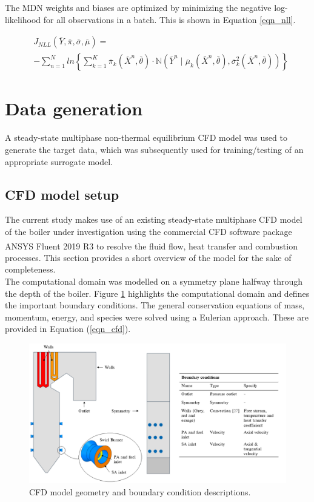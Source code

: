 \documentclass[a4paper,fleqn]{cas-dc}
\begin{document}
The MDN weights and biases are optimized by minimizing the negative log-likelihood for all observations in a batch. This is shown in Equation \ref{eqn_nll}.

\begin{equation}\label{eqn_nll}
\begin{split}
&J_{NLL}(\overline{Y},\overline{\pi},\overline{\sigma},\overline{\mu})=\\
&-\sum^N_{n=1}ln\left\{\sum^K_{k=1}\overline{\pi}_k(\overline{X}^n,\overline{\theta})\cdot \mathbb{N}(\overline{Y}^n\mid\overline{\mu}_k(\bar{X}^n,\bar{\theta}),\overline{\sigma}^2_k(\overline{X}^n,\overline{\theta})) \right\}
\end{split}
\end{equation}

\section{Data generation}
A steady-state multiphase non-thermal equilibrium CFD model was used to generate the target data, which was subsequently used for training/testing of an appropriate surrogate model.

\subsection{CFD model setup}
The current study makes use of an existing steady-state multiphase CFD model \cite{Rawlins2021, INFUB2022} of the boiler under investigation using the commercial CFD software package ANSYS\textsuperscript{\textregistered} Fluent 2019 R3 to resolve the fluid flow, heat transfer and combustion processes. This section provides a short overview of the model for the sake of completeness.\\

The computational domain was modelled on a symmetry plane halfway through the depth of the boiler. Figure \ref{fig_cfd_geom_bc} highlights the computational domain and defines the important boundary conditions. The general conservation equations of mass, momentum, energy, and species were solved using a Eulerian approach. These are provided in Equation (\ref{eqn_cfd}).\\ 

\begin{figure}[h!]
	\centering
		\includegraphics[scale=0.5]{CFD_GEOMETRY}
	  \caption{CFD model geometry and boundary condition descriptions.}\label{fig_cfd_geom_bc}
\end{figure}
\end{document}
